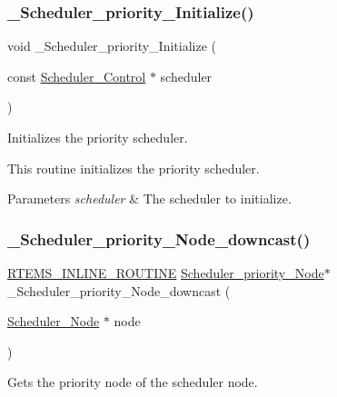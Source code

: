 \subsubsection{\texorpdfstring{\_Scheduler\_priority\_Initialize()}{\_Scheduler\_priority\_Initialize()}}
{\footnotesize\ttfamily void \+\_\+\+Scheduler\+\_\+priority\+\_\+\+Initialize (\begin{DoxyParamCaption}\item[{const \mbox{\hyperlink{struct__Scheduler__Control}{Scheduler\+\_\+\+Control}} $\ast$}]{scheduler }\end{DoxyParamCaption})}



Initializes the priority scheduler. 

This routine initializes the priority scheduler.


\begin{DoxyParams}{Parameters}
{\em scheduler} & The scheduler to initialize. \\
\hline
\end{DoxyParams}
\mbox{\label{group__RTEMSScoreSchedulerDPS_ga46493ec8bb581ce801bf2b20e5067cfd}} 
\subsubsection{\texorpdfstring{\_Scheduler\_priority\_Node\_downcast()}{\_Scheduler\_priority\_Node\_downcast()}}
{\footnotesize\ttfamily \mbox{\hyperlink{group__RTEMSScoreBaseDefs_gac216239df231d5dbd15e3520b0b9313f}{R\+T\+E\+M\+S\+\_\+\+I\+N\+L\+I\+N\+E\+\_\+\+R\+O\+U\+T\+I\+NE}} \mbox{\hyperlink{structScheduler__priority__Node}{Scheduler\+\_\+priority\+\_\+\+Node}}$\ast$ \+\_\+\+Scheduler\+\_\+priority\+\_\+\+Node\+\_\+downcast (\begin{DoxyParamCaption}\item[{\mbox{\hyperlink{structScheduler__Node}{Scheduler\+\_\+\+Node}} $\ast$}]{node }\end{DoxyParamCaption})}



Gets the priority node of the scheduler node. 


